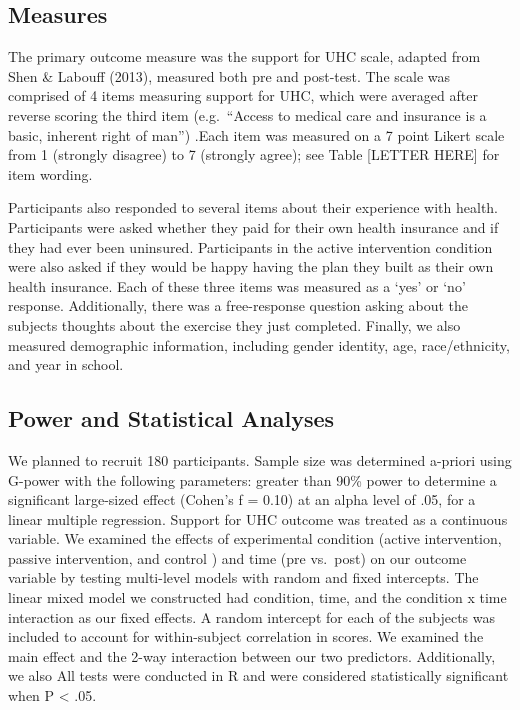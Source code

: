 \documentclass[
  english,
  man]{apa6}
\begin{document}
\hypertarget{measures-1}{%
\subsection{Measures}\label{measures-1}}

The primary outcome measure was the support for UHC scale, adapted from Shen \& Labouff (2013), measured both pre and post-test. The scale was comprised of 4 items measuring support for UHC, which were averaged after reverse scoring the third item (e.g.~``Access to medical care and insurance is a basic, inherent right of man'') .Each item was measured on a 7 point Likert scale from 1 (strongly disagree) to 7 (strongly agree); see Table {[}LETTER HERE{]} for item wording.

Participants also responded to several items about their experience with health. Participants were asked whether they paid for their own health insurance and if they had ever been uninsured. Participants in the active intervention condition were also asked if they would be happy having the plan they built as their own health insurance. Each of these three items was measured as a `yes' or `no' response. Additionally, there was a free-response question asking about the subjects thoughts about the exercise they just completed. Finally, we also measured demographic information, including gender identity, age, race/ethnicity, and year in school.

\hypertarget{power-and-statistical-analyses-1}{%
\subsection{Power and Statistical Analyses}\label{power-and-statistical-analyses-1}}

We planned to recruit 180 participants. Sample size was determined a-priori using G-power with the following parameters: greater than 90\% power to determine a significant large-sized effect (Cohen's f = 0.10) at an alpha level of .05, for a linear multiple regression. Support for UHC outcome was treated as a continuous variable. We examined the effects of experimental condition (active intervention, passive intervention, and control ) and time (pre vs.~post) on our outcome variable by testing multi-level models with random and fixed intercepts. The linear mixed model we constructed had condition, time, and the condition x time interaction as our fixed effects. A random intercept for each of the subjects was included to account for within-subject correlation in scores. We examined the main effect and the 2-way interaction between our two predictors. Additionally, we also All tests were conducted in R and were considered statistically significant when P \textless{} .05.
\end{document}
